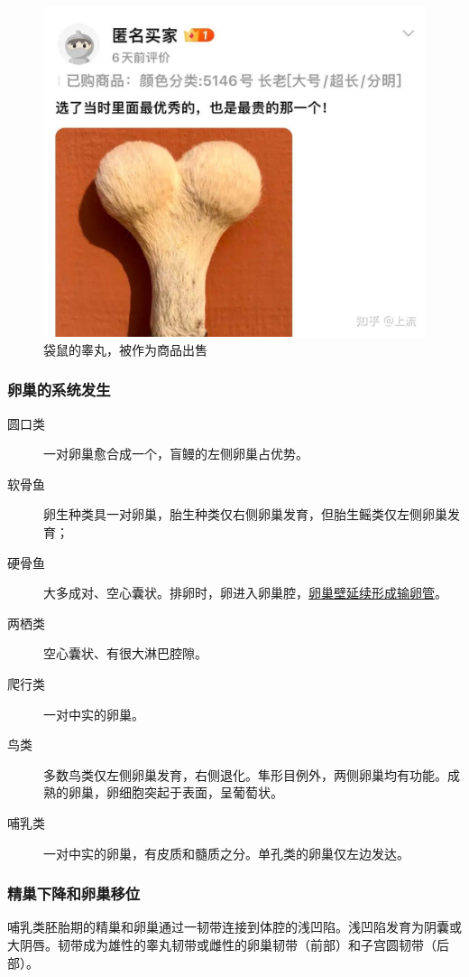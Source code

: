 \begin{figure}[htbp]
	\centering
	\includegraphics[width=0.7\linewidth]{Pics/袋鼠的睾丸}
	\caption{袋鼠的睾丸，被作为商品出售}
	\label{fig:ball_of_kangroo}
\end{figure}

\subsubsection{卵巢的系统发生}

\begin{description}
	\item[圆口类] 一对卵巢愈合成一个，盲鳗的左侧卵巢占优势。
	\item[软骨鱼] 卵生种类具一对卵巢，胎生种类仅右侧卵巢发育，但胎生鳐类仅左侧卵巢发育；
	\item[硬骨鱼] 大多成对、空心囊状。排卵时，卵进入卵巢腔，\uline{卵巢壁延续形成输卵管}。
	\item[两栖类] 空心囊状、有很大淋巴腔隙。
	\item[爬行类] 一对中实的卵巢。
	\item[鸟类] 多数鸟类仅左侧卵巢发育，右侧退化。隼形目例外，两侧卵巢均有功能。成熟的卵巢，卵细胞突起于表面，呈葡萄状。
	\item[哺乳类] 一对中实的卵巢，有皮质和髓质之分。单孔类的卵巢仅左边发达。
\end{description}

\subsubsection{精巢下降和卵巢移位}

哺乳类胚胎期的精巢和卵巢通过一韧带连接到体腔的浅凹陷。浅凹陷发育为阴囊或大阴唇。韧带成为雄性的睾丸韧带或雌性的卵巢韧带（前部）和子宫圆韧带（后部）。


